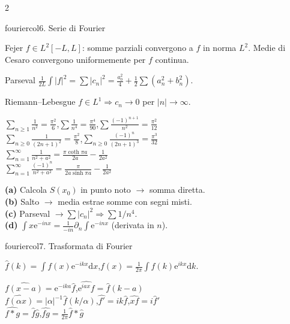 \documentclass[10pt,a4paper]{article}
\newcommand{\dd}{\mathrm{d}}
\newcommand{\eu}{\mathrm{e}}
\begin{document}
\begin{multicols}{2}
\begin{secbox}{fouriercol}{6. Serie di Fourier}
\begin{teobox}{Fejer}
$f\in L^2[-L,L]$: somme parziali convergono a $f$ in norma $L^2$. Medie di Cesaro convergono uniformemente per $f$ continua.
\end{teobox}

\begin{teobox}{Parseval}
$\frac{1}{2L}\int|f|^2=\sum|c_n|^2=\frac{a_0^2}{4}+\frac{1}{2}\sum(a_n^2+b_n^2)$.
\end{teobox}

\begin{teobox}{Riemann--Lebesgue}
$f\in L^1\Rightarrow c_n\to 0$ per $|n|\to\infty$.
\end{teobox}

$\sum_{n\ge1}\frac{1}{n^2}=\frac{\pi^2}{6}$,\;$\sum\frac{1}{n^4}=\frac{\pi^4}{90}$,\;$\sum\frac{(-1)^{n+1}}{n^2}=\frac{\pi^2}{12}$\\
$\sum_{n\ge0}\frac{1}{(2n+1)^2}=\frac{\pi^2}{8}$,\;$\sum_{n\ge0}\frac{(-1)^n}{(2n+1)^3}=\frac{\pi^3}{32}$\\
$\sum_{n=1}^\infty\frac{1}{n^2+a^2}=\frac{\pi\coth\pi a}{2a}-\frac{1}{2a^2}$\\
$\sum_{n=1}^\infty\frac{(-1)^n}{n^2+a^2}=\frac{\pi}{2a\sinh\pi a}-\frac{1}{2a^2}$

\textbf{(a)} Calcola $S(x_0)$ in punto noto $\to$ somma diretta.\\
\textbf{(b)} Salto $\to$ media estrae somme con segni misti.\\
\textbf{(c)} Parseval $\to\sum|c_n|^2\Rightarrow\sum 1/n^4$.\\
\textbf{(d)} $\int x\eu^{-inx}=\frac{1}{-in}\partial_n\int\eu^{-inx}$ (derivata in $n$).

\end{secbox}

\begin{secbox}{fouriercol}{7. Trasformata di Fourier}

$\hat f(k)=\int f(x)\eu^{-ikx}\dd x$,\;$f(x)=\frac{1}{2\pi}\int\hat f(k)\eu^{ikx}\dd k$.

$\widehat{f(x-a)}=\eu^{-ika}\hat f$,\;$\widehat{\eu^{iax}f}=\hat f(k-a)$\\
$\widehat{f(\alpha x)}=|\alpha|^{-1}\hat f(k/\alpha)$,\;$\widehat{f'}=ik\hat f$,\;$\widehat{xf}=i\hat f'$\\
$\widehat{f*g}=\hat f\hat g$,\;$\widehat{fg}=\frac{1}{2\pi}\hat f*\hat g$


\end{secbox}
\end{multicols}
\end{document}
